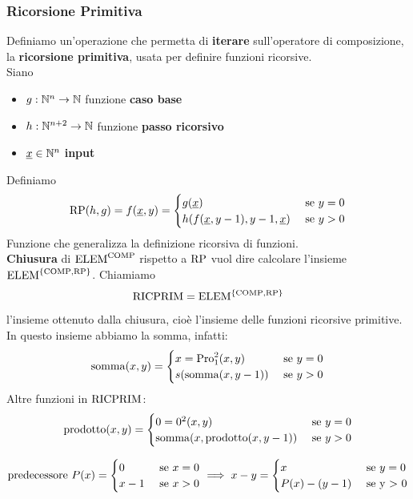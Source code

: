 \subsubsection{Ricorsione Primitiva}
Definiamo un'operazione che permetta di \textbf{iterare} sull'operatore di composizione, la \textbf{ricorsione primitiva}, usata per definire funzioni ricorsive. \\

Siano 
\begin{itemize}
	\item $g: \mathbb{N}^n \rightarrow \mathbb{N}$ funzione \textbf{caso base}
	\item $h: \mathbb{N}^{n+2} \rightarrow \mathbb{N}$ funzione \textbf{passo ricorsivo}
	\item $\underline{x} \in \mathbb{N}^n$ \textbf{input}
\end{itemize}

Definiamo
$$
\text{RP} (h,g) = f(\underline{x}, y) = \begin{cases}
	g(\underline{x}) & \text{ se } y = 0 \\
	h(f(\underline{x}, y-1), y-1, \underline{x}) & \text{ se } y > 0 \\
\end{cases}
$$
Funzione che generalizza la definizione ricorsiva di funzioni.\\

\textbf{Chiusura} di $\text{ELEM}^{\text{COMP}}$ rispetto a $\text{RP}$ vuol dire calcolare l'insieme $\text{ELEM}^{\{\text{COMP}, \text{RP}\}}$. Chiamiamo
$$ \text{RICPRIM} = \text{ELEM}^{\{\text{COMP}, \text{RP}\}} $$
l'insieme ottenuto dalla chiusura, cioè l'insieme delle funzioni ricorsive primitive.\\

In questo insieme abbiamo la somma, infatti: 
$$
\operatorname{somma}(x,y) = \begin{cases}
	x = \text{Pro}_1^2 (x,y) & \text{ se } y = 0 \\
	s (\operatorname{somma}(x, y-1)) & \text{ se } y > 0 \\
\end{cases}
$$
Altre funzioni in $\text{RICPRIM}$:
$$ 
\operatorname{prodotto} (x,y) = \begin{cases}
	0 = 0^2 (x,y) & \text{ se } y = 0 \\
	\operatorname{somma}(x, \operatorname{prodotto}(x, y-1)) & \text{ se } y > 0 \\
\end{cases}
$$

$$
\operatorname{predecessore} \, P(x) = \begin{cases}
	0 & \text{ se } x = 0 \\
	x-1 & \text{ se } x > 0
\end{cases}
\implies 
x-y = \begin{cases}
	x & \text{ se } y = 0 \\
	P(x) - (y-1) & \text{ se y > 0}
\end{cases}
$$
\\

